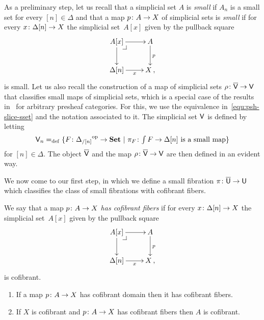\documentclass[reqno,10pt,a4paper,oneside,draft]{amsart}
\begin{document}
\medskip

As a preliminary step, let us recall that a simplicial set $A$ is \emph{small}  if $A_n$ is a small set for every $[n] \in \Delta$ and that a map $p \colon A \to X$ of simplicial sets is \emph{small} if for every $x \colon \Delta[n] 
\to X$ the simplicial set~$A[x]$ given by the pullback square
\[
\xymatrix{
A[x] \ar[r] \ar[d] \drpullback & A \ar[d]^{p} \\
\Delta[n] \ar[r]_-{x} & X \, , }
\]
is small. Let us also recall the  construction of a map of simplicial sets $\rho \colon \overline{\mathsf{V}} \to \mathsf{V}$ that classifies
small maps of simplicial sets, which is a special case of the results in~\cite{hofmann-streicher-universes} for arbitrary presheaf categories.  For this, we use the equivalence in~\eqref{equ:psh-slice-sset} and the notation associated to it.
The simplicial set $\mathsf{V}$ is defined by letting
\[
\mathsf{V}_n =_{\operatorname{def}} \{ F \colon {\Delta_{/[n]}}^{\operatorname{op}} \to \mathbf{Set} \ | \ \pi_F \colon \textstyle{\int F} \to \Delta[n] \text{ is a small
map} \}
\]
for $[n] \in \Delta$. The object $\overline{\mathsf{V}}$ and the map $\rho \colon \overline{\mathsf{V}} \to \mathsf{V}$ are then defined in an evident way. 


\bigskip

We now come to our first step, in which we define a small fibration $\pi \colon \overline{\mathsf{U}} \to \mathsf{U}$ which 
classifies the class of small fibrations with cofibrant fibers. 

\begin{definition} We say that a map $p \colon A \to X$ \emph{has cofibrant fibers} if for every $x \colon \Delta[n] 
\to X$ the simplicial set~$A[x]$ given by the pullback square
\[
\xymatrix{
A[x] \ar[r] \ar[d] \drpullback & A \ar[d]^{p} \\
\Delta[n] \ar[r]_-{x} & X \, , }
\]
is cofibrant.
\end{definition}


\begin{lemma} \label{lem:Cofib_fiber} \hfill 
\begin{enumerate}[$(i)$]
\item If a map $p \colon A \rightarrow X$ has cofibrant domain then it has cofibrant fibers.
\item If $X$ is cofibrant and $p \colon A \rightarrow X$ has cofibrant fibers then $A$ is cofibrant.
\end{enumerate}
\end{lemma} 
\end{document}
